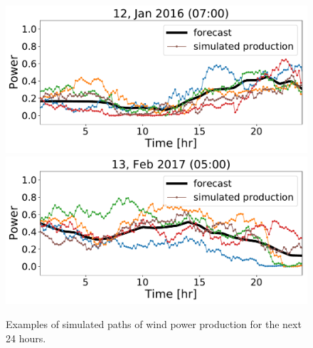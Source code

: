 \documentclass[ima, 25pt, portrait, plainboxedsections]{sciposter}
\begin{document}
\begin{multicols}{3}
 \begin{figure}[t]
 \begin{center}
    \includegraphics[width=1\linewidth]{simulated/24hr/19.pdf}  %
    \includegraphics[width=1\linewidth]{simulated/24hr/1099.pdf}
 \end{center}
    \caption{ Examples of simulated paths of wind power production for the next 24 hours.}
 \label{simulated_24hr}
 \end{figure}


\end{multicols}
\end{document}
